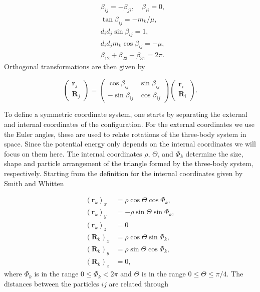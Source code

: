 \begin{subequations}
	\begin{align}
	&\beta_{ij} = -\beta_{ji}, \quad \beta_{ii} = 0,\\
	&\tan\beta_{ij} = -m_k/\mu,\\
	&d_{i}d_{j} \sin\beta_{ij} = 1,\\
	&d_{i}d_{j} m_{k} \cos\beta_{ij} = -\mu,\\
	&\beta_{12}+\beta_{23}+\beta_{31} = 2\pi.
	\end{align}
\end{subequations}
Orthogonal transformations are then given by 

\begin{equation}\label{eq:kinematic_rot}
\begin{pmatrix}
\mathbf{r}_j\\
\mathbf{R}_j
\end{pmatrix}
=
\begin{pmatrix}
\cos\beta_{ij} & \sin\beta_{ij}\\
-\sin\beta_{ij} & \cos\beta_{ij}
\end{pmatrix}
\begin{pmatrix}
\mathbf{r}_i\\
\mathbf{R}_i
\end{pmatrix}.
\end{equation}   

To define a symmetric coordinate system, one starts by separating the external and internal coordinates of the configuration. For the external coordinates we use the Euler angles, these are used to relate rotations of the three-body system in space. Since the potential energy only depends on the internal coordinates we will focus on them here. The internal coordinates $\rho$, $\Theta$, and $\Phi_k$ determine the size, shape and particle arrangement of the triangle formed by the three-body system, respectively. Starting from the definition for the internal coordinates given by Smith and Whitten \cite{Smith_Whitten1968}

\begin{equation}
	\begin{aligned}
	(\mathbf{r}_k)_x &= \rho \cos\Theta\cos\Phi_k,\\
	(\mathbf{r}_k)_y &= -\rho \sin\Theta\sin\Phi_k,\\
	(\mathbf{r}_k)_z &= 0\\
	(\mathbf{R}_k)_x &= \rho \cos\Theta\sin\Phi_k,\\
	(\mathbf{R}_k)_y &= \rho \sin\Theta\cos\Phi_k,\\
	(\mathbf{R}_k)_z &= 0,
	\end{aligned}   
\end{equation}
where $\Phi_k$ is in the range $0 \leq \Phi_k < 2\pi$ and $\Theta$ is in the range $0 \leq \Theta \leq \pi/4$. The distances between the particles $ij$ are related through 

